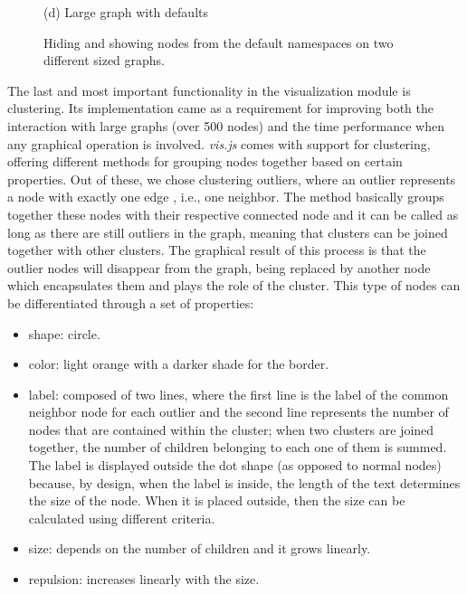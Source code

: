 \begin{figure}[htb]
\begin{minipage}[b]{0.48\linewidth}
  \centerline{(d) Large graph with defaults}\medskip
\end{minipage}
\caption{Hiding and showing nodes from the default namespaces on two different sized graphs.}
\label{img:defaults}
\end{figure}

The last and most important functionality in the visualization module is clustering. Its implementation came as a requirement for improving both the interaction with large graphs (over 500 nodes) and the time performance when any graphical operation is involved. \textit{vis.js} comes with support for clustering, offering different methods for grouping nodes together based on certain properties. Out of these, we chose clustering outliers, where an outlier represents a node with exactly one edge , i.e., one neighbor. The method basically groups together these nodes with their respective connected node and it can be called as long as there are still outliers in the graph, meaning that clusters can be joined together with other clusters. The graphical result of this process is that the outlier nodes will disappear from the graph, being replaced by another node which encapsulates them and plays the role of the cluster. This type of nodes can be differentiated through a set of properties:

\begin{itemize}
	\item shape: circle.
	\item color: light orange with a darker shade for the border.
	\item label: composed of two lines, where the first line is the label of the common neighbor node for each outlier and the second line represents the number of nodes that are contained within the cluster; when two clusters are joined together, the number of children belonging to each one of them is summed. The label is displayed outside the dot shape (as opposed to normal nodes) because, by design, when the label is inside, the length of the text determines the size of the node. When it is placed outside, then the size can be calculated using different criteria.
	\item size: depends on the number of children and it grows linearly.
	\item repulsion: increases linearly with the size.
\end{itemize}


